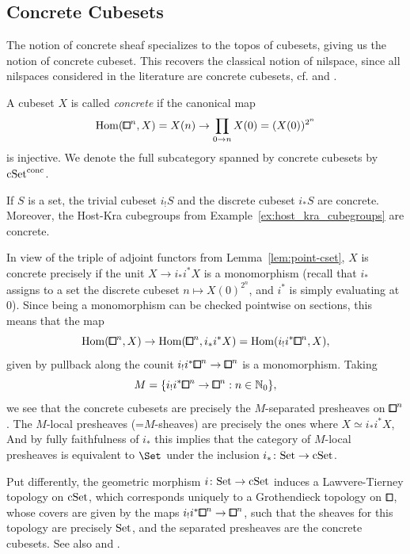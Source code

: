 \subsection{Concrete Cubesets}\label{ssec:concrete-cubesets}

The notion of concrete sheaf \cite{Dubuc1979} specializes to the topos of cubesets,
giving us the notion of concrete cubeset.
This recovers the classical notion of nilspace, since all nilspaces considered in the literature
are concrete cubesets, cf. \cite[Definition 1.2.1]{Candela2017} and \cite[Definition 3.2]{Gutman2020}.

\begin{definition}\label{def:concrete-cubeset}
A cubeset $X$ is called \emph{concrete} if the canonical map
\[
    \hom({\bbox}^n,X) = X(n) \to \prod_{0\to n} X(0) = (X(0))^{2^n}
\]
is injective.
We denote the full subcategory spanned by concrete cubesets by $\mathrm{cSet}^\mathrm{conc}$.
\end{definition}

\begin{example}
If $S$ is a set, the trivial cubeset $i_! S$ and the discrete cubeset $i_* S$ are concrete.
Moreover, the Host-Kra cubegroups from Example~\ref{ex:host_kra_cubegroups} are concrete.
\end{example}

\begin{remark}
In view of the triple of adjoint functors from Lemma~\ref{lem:point-cset},
$X$ is concrete precisely if the unit $X\to i_\ast i^\ast X$ is a monomorphism
(recall that $i_{*}$ assigns to a set the discrete cubeset $n\mapsto X(0)^{2^n}$, and $i^*$ is simply evaluating at $0$).
Since being a monomorphism can be checked pointwise on sections, this means that the map
\[
    \hom({\bbox}^n,X)\to\hom({\bbox}^n,i_\ast i^\ast X) = \hom(i_! i^\ast {\bbox}^n,X),
\]
given by pullback along the counit $i_!i^\ast{\bbox}^n\to{\bbox}^n$ is a monomorphism.
Taking
\[
    M = \{i_!i^\ast{\bbox}^n\to{\bbox}^n : n\in\N_0\},
\]
we see that the concrete cubesets are precisely the $M$-separated presheaves on ${\bbox}^n$.
The $M$-local presheaves (=$M$-sheaves) are precisely the ones where $X \simeq i_\ast i^\ast X$,
And by fully faithfulness of $i_\ast$ this implies that the category of $M$-local presheaves is equivalent to $\Set$ under the inclusion $i_\ast\colon\mathrm{Set}\to\mathrm{cSet}$.

Put differently, the geometric morphism $i\colon\mathrm{Set}\to\mathrm{cSet}$ induces a Lawvere-Tierney topology on $\mathrm{cSet}$,
which corresponds uniquely to a Grothendieck topology on $\bbox$,
whose covers are given by the maps $i_!i^\ast{\bbox}^n\to{\bbox}^n$,
such that the sheaves for this topology are precisely $\mathrm{Set}$, and the separated presheaves are the concrete cubesets.
See also \cite[Chapter V]{MacLane1994} and \cite[Chapter A4.3]{Johnstone2002}.
\end{remark}

